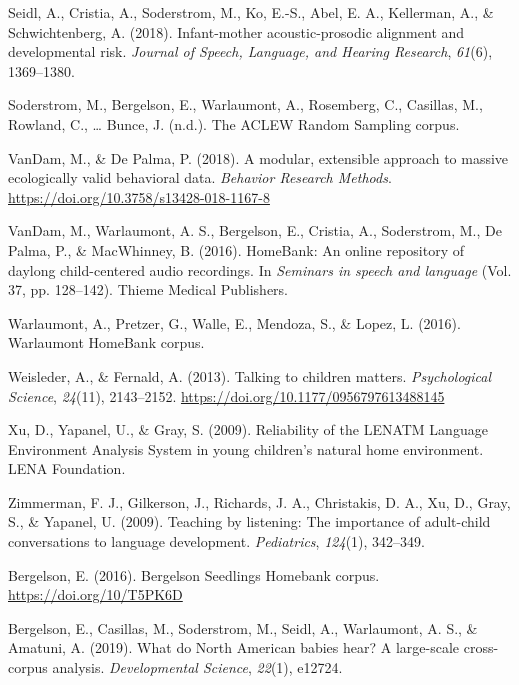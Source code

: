 \documentclass[english,table,man,floatsintext]{apa6}
\begin{document}
\leavevmode\hypertarget{ref-Seidl2018}{}%
Seidl, A., Cristia, A., Soderstrom, M., Ko, E.-S., Abel, E. A., Kellerman, A., \& Schwichtenberg, A. (2018). Infant-mother acoustic-prosodic alignment and developmental risk. \emph{Journal of Speech, Language, and Hearing Research}, \emph{61}(6), 1369--1380.

\leavevmode\hypertarget{ref-soderstrom}{}%
Soderstrom, M., Bergelson, E., Warlaumont, A., Rosemberg, C., Casillas, M., Rowland, C., \ldots{} Bunce, J. (n.d.). The ACLEW Random Sampling corpus.

\leavevmode\hypertarget{ref-VanDam2018}{}%
VanDam, M., \& De Palma, P. (2018). A modular, extensible approach to massive ecologically valid behavioral data. \emph{Behavior Research Methods}. \url{https://doi.org/10.3758/s13428-018-1167-8}

\leavevmode\hypertarget{ref-vandam2016homebank}{}%
VanDam, M., Warlaumont, A. S., Bergelson, E., Cristia, A., Soderstrom, M., De Palma, P., \& MacWhinney, B. (2016). HomeBank: An online repository of daylong child-centered audio recordings. In \emph{Seminars in speech and language} (Vol. 37, pp. 128--142). Thieme Medical Publishers.

\leavevmode\hypertarget{ref-warlaumont2016warlaumont}{}%
Warlaumont, A., Pretzer, G., Walle, E., Mendoza, S., \& Lopez, L. (2016). Warlaumont HomeBank corpus.

\leavevmode\hypertarget{ref-Weisleder2013a}{}%
Weisleder, A., \& Fernald, A. (2013). Talking to children matters. \emph{Psychological Science}, \emph{24}(11), 2143--2152. \url{https://doi.org/10.1177/0956797613488145}

\leavevmode\hypertarget{ref-Xu2009a}{}%
Xu, D., Yapanel, U., \& Gray, S. (2009). Reliability of the LENATM Language Environment Analysis System in young children's natural home environment. LENA Foundation.

\leavevmode\hypertarget{ref-zimmerman2009}{}%
Zimmerman, F. J., Gilkerson, J., Richards, J. A., Christakis, D. A., Xu, D., Gray, S., \& Yapanel, U. (2009). Teaching by listening: The importance of adult-child conversations to language development. \emph{Pediatrics}, \emph{124}(1), 342--349.

\leavevmode\hypertarget{ref-bergelson2016bergelson}{}%
Bergelson, E. (2016). Bergelson Seedlings Homebank corpus. \url{https://doi.org/10/T5PK6D}

\leavevmode\hypertarget{ref-bergelson2019north}{}%
Bergelson, E., Casillas, M., Soderstrom, M., Seidl, A., Warlaumont, A. S., \& Amatuni, A. (2019). What do North American babies hear? A large-scale cross-corpus analysis. \emph{Developmental Science}, \emph{22}(1), e12724.
\end{document}
